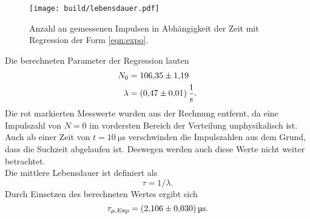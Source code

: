 \begin{figure}[H]
  \centering
  \texttt{[image: build/lebensdauer.pdf]}
  \caption{Anzahl an gemessenen Impulsen in Abhängigkeit der Zeit mit Regression der Form \ref{eqn:expo}.}
  \label{fig:lebensdauer}
\end{figure}
\noindent
Die berechneten Parameter der Regression lauten
\begin{align*}
  N_0    &=\num{106.35 \pm 1.19} \\
  \lambda&=\SI{0.47 \pm 0.01}{\per\second}.
\end{align*}
Die rot markierten Messwerte wurden aus der Rechnung entfernt, da eine Impulszahl von $N=0$ im vordersten Bereich der Verteilung unphysikalisch ist. Auch ab einer 
Zeit von $t=\SI{10}{\micro\second}$ verschwinden die Impulszahlen aus dem Grund, dass die Suchzeit abgelaufen ist. Deswegen werden auch diese Werte nicht weiter
betrachtet.
\\\noindent
Die mittlere Lebensdauer ist definiert als
\begin{equation*}
  \tau=1/\lambda .
\end{equation*}
Durch Einsetzen des berechneten Wertes ergibt sich 
\begin{equation*}
  \tau_{\mu,\text{Exp}}=\SI{2.106\pm0.030}{\micro\second}.
\end{equation*}

